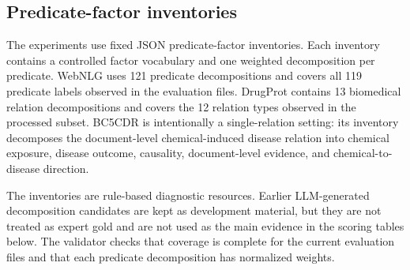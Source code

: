 \subsection{Predicate-factor inventories}
The experiments use fixed JSON predicate-factor inventories. Each inventory contains a controlled factor vocabulary and one weighted decomposition per predicate. WebNLG uses 121 predicate decompositions and covers all 119 predicate labels observed in the evaluation files. DrugProt contains 13 biomedical relation decompositions and covers the 12 relation types observed in the processed subset. BC5CDR is intentionally a single-relation setting: its inventory decomposes the document-level chemical-induced disease relation into chemical exposure, disease outcome, causality, document-level evidence, and chemical-to-disease direction.

The inventories are rule-based diagnostic resources. Earlier LLM-generated decomposition candidates are kept as development material, but they are not treated as expert gold and are not used as the main evidence in the scoring tables below. The validator checks that coverage is complete for the current evaluation files and that each predicate decomposition has normalized weights.
